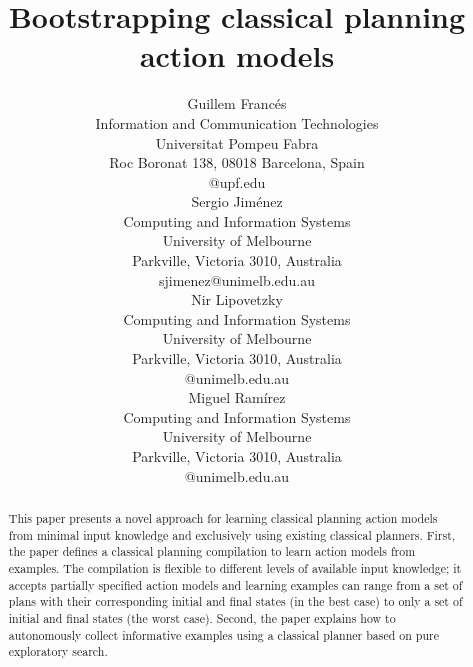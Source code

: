 \documentclass[letterpaper]{article} %
\begin{document}
\title{Bootstrapping classical planning action models}

\author{Guillem Franc\'es\\
{\small Information and Communication Technologies}\\
{\small Universitat Pompeu Fabra}\\
{\small Roc Boronat 138, 08018 Barcelona, Spain}\\
{\small @upf.edu}\\
\And Sergio Jim\'enez\\
{\small Computing and Information Systems}\\
{\small University of Melbourne}\\
{\small Parkville, Victoria 3010, Australia}\\
{\small sjimenez@unimelb.edu.au}\\
\And Nir Lipovetzky\\
{\small Computing and Information Systems}\\
{\small University of Melbourne}\\
{\small Parkville, Victoria 3010, Australia}\\
{\small @unimelb.edu.au}\\
\And Miguel Ram\'irez\\
{\small Computing and Information Systems}\\
{\small University of Melbourne}\\
{\small Parkville, Victoria 3010, Australia}\\
{\small @unimelb.edu.au}\\
}
 
\maketitle
\begin{abstract}
This paper presents a novel approach for learning classical planning action models from minimal input knowledge and exclusively using existing classical planners. First, the paper defines a classical planning compilation to learn action models from examples. The compilation is flexible to different levels of available input knowledge; it accepts partially specified action models and learning examples can range from a set of plans with their corresponding initial and final states (in the best case) to only a set of initial and final states (the worst case). Second, the paper explains how to autonomously collect informative examples using a classical planner based on pure exploratory search. 
\end{abstract}
\end{document}
